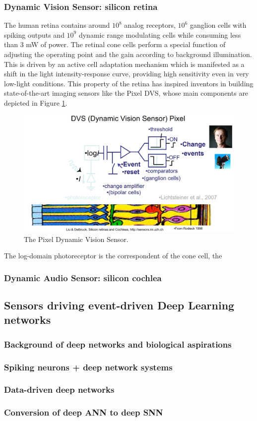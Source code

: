 \documentclass[main]{subfiles}
\begin{document}
\subsubsection{Dynamic Vision Sensor: silicon retina}
The human retina contains around $10^8$ analog receptors, $10^6$ ganglion cells with spiking outputs and $10^9$ dynamic range modulating cells while consuming less than 3 mW of power. The retinal cone cells perform a special function of adjusting the operating point and the gain according to background illumination. This is driven by an active cell adaptation mechanism which is manifested as a shift in the light intensity-response curve, providing high sensitivity even in very low-light conditions. This property of the retina has inspired inventors in building state-of-the-art imaging sensors like the Pixel DVS, whose main components are depicted in Figure \ref{fig:dvs}.
%
\begin{figure}[h]
    \centering
    \includegraphics[width=0.8\linewidth]{11_NeuromorphicSystems1/figures/DVS.PNG}
    \caption{The Pixel Dynamic Vision Sensor.}
    \label{fig:dvs}
\end{figure}
%
The log-domain photoreceptor is the correspondent of the cone cell, the 
\subsubsection{Dynamic Audio Sensor: silicon cochlea}
\subsection{Sensors driving event-driven Deep Learning networks}
\subsubsection{Background of deep networks and biological aspirations}
\subsubsection{Spiking neurons + deep network systems}
\subsubsection{Data-driven deep networks}
\subsubsection{Conversion of deep ANN to deep SNN}
\end{document}
